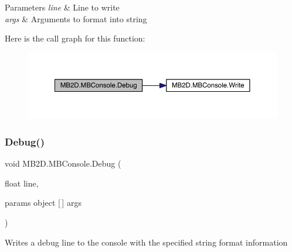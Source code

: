 \begin{DoxyParams}{Parameters}
{\em line} & Line to write\\
\hline
{\em args} & Arguments to format into string\\
\hline
\end{DoxyParams}
Here is the call graph for this function\+:\nopagebreak
\begin{figure}[H]
\begin{center}
\leavevmode
\includegraphics[width=350pt]{class_m_b2_d_1_1_m_b_console_aef53935b8ae3c6cd2b87a81e5dbcdf1e_cgraph}
\end{center}
\end{figure}
\hypertarget{class_m_b2_d_1_1_m_b_console_a918307d1a003684b1fa3e0d11243b1f9}{}\label{class_m_b2_d_1_1_m_b_console_a918307d1a003684b1fa3e0d11243b1f9} 
\subsubsection{\texorpdfstring{Debug()}{Debug()}\hspace{0.1cm}{\footnotesize\ttfamily [4/4]}}
{\footnotesize\ttfamily void M\+B2\+D.\+M\+B\+Console.\+Debug (\begin{DoxyParamCaption}\item[{float}]{line,  }\item[{params object \mbox{[}$\,$\mbox{]}}]{args }\end{DoxyParamCaption})\hspace{0.3cm}{\ttfamily [inline]}}



Writes a debug line to the console with the specified string format information 


